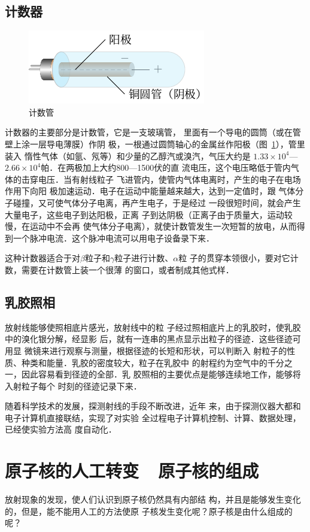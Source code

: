 \subsection{计数器}
\begin{figure}[htbp]
    \centering
    \includegraphics{fig/C/9-4.pdf}
    \caption{计数管}\label{fig_C_9-4}
\end{figure}

计数器的主要部分是计数管，它是一支玻璃管，
里面有一个导电的圆筒（或在管壁上涂一层导电薄膜）作阴
极，一根通过圆筒轴心的金属丝作阳极（图~\ref{fig_C_9-4}），管里装入
惰性气体（如氩、氖等）和少量的乙醇汽或溴汽，气压大约是
$1.33\times10^4$—$2.66\times10^4$帕．在两极加上大约800—1500伏的直
流电压，这个电压略低于管内气体的击穿电压．当有射线粒子
飞进管内，使管内气体电离时，产生的电子在电场作用下向阳
极加速运动．电子在运动中能量越来越大，达到一定值时，跟
气体分子碰撞，又可使气体分子电离，再产生电子，于是经过
一段很短时间，就会产生大量电子，这些电子到达阳极，正离
子到达阴极（正离子由于质量大，运动较慢，在运动中不会再
使气体分子电离），就使计数管发生一次短暂的放电，从而得
到一个脉冲电流．这个脉冲电流可以用电子设备录下来．

这种计数器适合于对$\beta$粒子和$\gamma$粒子进行计数、$\alpha$粒
子的贯穿本领很小，要对它计数，需要在计数管上装一个很薄
的窗口，或者制成其他式样．

\subsection{乳胶照相}

放射线能够使照相底片感光，放射线中的粒
子经过照相底片上的乳胶时，使乳胶中的溴化银分解，经显影
后，就有一连串的黑点显示出粒子的径迹．这些径迹可用显
微镜来进行观察与测量，根据径迹的长短和形状，可以判断入
射粒子的性质、种类和能量．乳胶的密度较大，粒子在乳胶中
的射程约为空气中的千分之一，因此容易看到径迹的全部．乳
胶照相的主要优点是能够连续地工作，能够将入射粒子每个
时刻的径迹记录下来．

随着科学技术的发展，探测射线的手段不断改进，近年
来，由于探测仪器大都和电子计算机直接联结，实现了对实验
全过程电子计算机控制、计算、数据处理，已经使实验方法高
度自动化．

\section{原子核的人工转变~~原子核的组成}
放射现象的发现，使人们认识到原子核仍然具有内部结
构，并且是能够发生变化的，但是，能不能用人工的方法使原
子核发生变化呢？原子核是由什么组成的呢？

